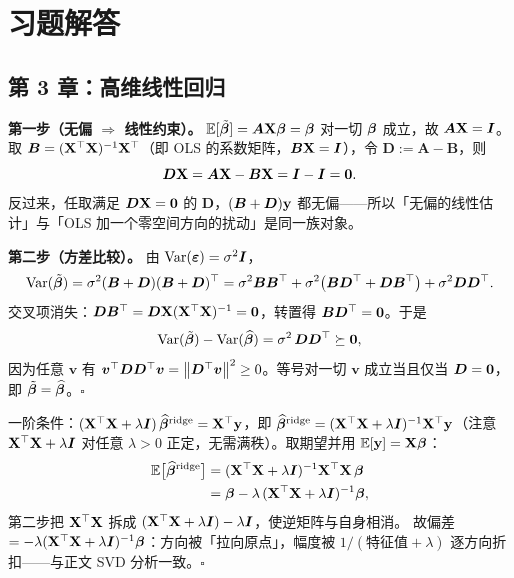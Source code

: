 \appendix
\section{习题解答}\label{sec:solutions}

\subsection{第 3 章：高维线性回归}

\begin{description}[style=nextline, itemsep=1.2ex]
\item[练习 \ref{ex:gm}（Gauss--Markov 补证）]
\textbf{第一步（无偏 $\Rightarrow$ 线性约束）。} $\mathbb{E}[\tilde{\bm{\beta}}] = \bm{A}\mathbf{X}\bm{\beta} = \bm{\beta}$ 对一切 $\bm{\beta}$ 成立，故 $\bm{A}\mathbf{X} = \bm{I}$。取 $\bm{B} = (\mathbf{X}^\top\mathbf{X})^{-1}\mathbf{X}^\top$（即 OLS 的系数矩阵，$\bm{B}\mathbf{X} = \bm{I}$），令 $\bm{D} := \bm{A} - \bm{B}$，则
\[
  \bm{D}\mathbf{X} = \bm{A}\mathbf{X} - \bm{B}\mathbf{X} = \bm{I} - \bm{I} = \mathbf{0} .
\]
反过来，任取满足 $\bm{D}\mathbf{X} = \mathbf{0}$ 的 $\bm{D}$，$(\bm{B}+\bm{D})\mathbf{y}$ 都无偏——所以「无偏的线性估计」与「OLS 加一个零空间方向的扰动」是同一族对象。

\textbf{第二步（方差比较）。} 由 $\mathrm{Var}(\bm{\varepsilon}) = \sigma^2\bm{I}$，
\[
  \mathrm{Var}(\tilde{\bm{\beta}}) = \sigma^2 (\bm{B}+\bm{D})(\bm{B}+\bm{D})^\top
  = \sigma^2\bm{B}\bm{B}^\top + \sigma^2\big(\bm{B}\bm{D}^\top + \bm{D}\bm{B}^\top\big) + \sigma^2\bm{D}\bm{D}^\top .
\]
交叉项消失：$\bm{D}\bm{B}^\top = \bm{D}\mathbf{X}(\mathbf{X}^\top\mathbf{X})^{-1} = \mathbf{0}$，转置得 $\bm{B}\bm{D}^\top = \mathbf{0}$。于是
\[
  \mathrm{Var}(\tilde{\bm{\beta}}) - \mathrm{Var}(\widehat{\bm{\beta}}) = \sigma^2\,\bm{D}\bm{D}^\top \succeq \mathbf{0},
\]
因为任意 $\bm{v}$ 有 $\bm{v}^\top \bm{D}\bm{D}^\top \bm{v} = \left\lVert \bm{D}^\top \bm{v} \right\rVert^2 \ge 0$。等号对一切 $\bm{v}$ 成立当且仅当 $\bm{D} = \mathbf{0}$，即 $\tilde{\bm{\beta}} = \widehat{\bm{\beta}}$。$\square$

\item[练习 \ref{ex:ridge-bias}（岭回归的偏差）]
一阶条件：$(\mathbf{X}^\top\mathbf{X} + \lambda\bm{I})\,\widehat{\bm{\beta}}^{\mathrm{ridge}} = \mathbf{X}^\top\mathbf{y}$，即 $\widehat{\bm{\beta}}^{\mathrm{ridge}} = (\mathbf{X}^\top\mathbf{X} + \lambda\bm{I})^{-1}\mathbf{X}^\top\mathbf{y}$（注意 $\mathbf{X}^\top\mathbf{X} + \lambda\bm{I}$ 对任意 $\lambda > 0$ 正定，无需满秩）。取期望并用 $\mathbb{E}[\mathbf{y}] = \mathbf{X}\bm{\beta}$：
\[
\begin{aligned}
  \mathbb{E}\big[\widehat{\bm{\beta}}^{\mathrm{ridge}}\big]
  &= (\mathbf{X}^\top\mathbf{X} + \lambda\bm{I})^{-1}\mathbf{X}^\top\mathbf{X}\,\bm{\beta} \\
  &= \bm{\beta} - \lambda\,(\mathbf{X}^\top\mathbf{X} + \lambda\bm{I})^{-1}\bm{\beta} ,
\end{aligned}
\]
第二步把 $\mathbf{X}^\top\mathbf{X}$ 拆成 $(\mathbf{X}^\top\mathbf{X} + \lambda\bm{I}) - \lambda\bm{I}$，使逆矩阵与自身相消。
故偏差 $= -\lambda(\mathbf{X}^\top\mathbf{X} + \lambda\bm{I})^{-1}\bm{\beta}$：方向被「拉向原点」，幅度被 $1/(\text{特征值}+\lambda)$ 逐方向折扣——与正文 SVD 分析一致。$\square$
\end{description}

